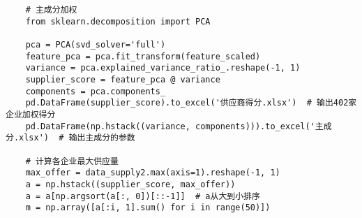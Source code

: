 \documentclass[UTF8]{ctexart}
\begin{document}
\begin{lstlisting}
	# 主成分加权
	from sklearn.decomposition import PCA
	
	pca = PCA(svd_solver='full')
	feature_pca = pca.fit_transform(feature_scaled)
	variance = pca.explained_variance_ratio_.reshape(-1, 1)
	supplier_score = feature_pca @ variance
	components = pca.components_
	pd.DataFrame(supplier_score).to_excel('供应商得分.xlsx')  # 输出402家企业加权得分
	pd.DataFrame(np.hstack((variance, components))).to_excel('主成分.xlsx')  # 输出主成分的参数
	
	# 计算各企业最大供应量
	max_offer = data_supply2.max(axis=1).reshape(-1, 1)
	a = np.hstack((supplier_score, max_offer))
	a = a[np.argsort(a[:, 0])[::-1]]  # a从大到小排序
	m = np.array([a[:i, 1].sum() for i in range(50)])
	

		
\end{lstlisting}
\end{document}
